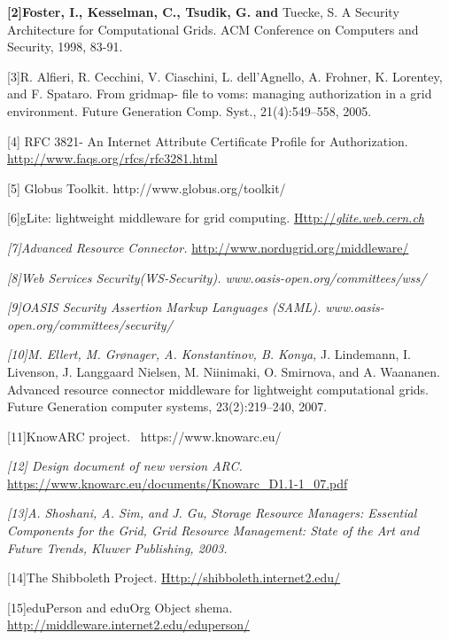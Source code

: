 \documentclass{article}
\newcommand\textstyleStrongEmphasis[1]{\textbf{#1}}
\newcommand\textstyleCitation[1]{\textit{#1}}
\begin{document}
\textstyleStrongEmphasis{\textmd{[2]}}\textstyleStrongEmphasis{\textmd{Foster,
I., Kesselman, C., Tsudik, G. and }}Tuecke, S. A Security Architecture
for Computational Grids. ACM Conference on Computers and Security,
1998, 83-91.

[3]R. Alfieri, R. Cecchini, V. Ciaschini, L.
dell{\textquoteright}Agnello, A. Frohner, K. Lorentey, and F. Spataro.
From gridmap- file to voms: managing authorization in a grid
environment. Future Generation Comp. Syst., 21(4):549--558, 2005. 

[4] RFC 3821- An Internet Attribute Certificate Profile for
Authorization. \url{http://www.faqs.org/rfcs/rfc3281.html}

[5] Globus Toolkit. http://www.globus.org/toolkit/

[6]gLite: lightweight middleware for grid computing.
\href{http://glite.web.cern.ch/}{Http://}\href{http://glite.web.cern.ch/}{\textstyleCitation{\textup{glite.web.cern.ch}}}

\textstyleCitation{\textup{[7]Advanced Resource Connector.
}}\url{http://www.nordugrid.org/middleware/}

\textstyleCitation{\textup{[8]Web Services Security(WS-Security).
www.oasis-open.org/committees/wss/}}

\textstyleCitation{\textup{[9]OASIS Security Assertion Markup Languages
(SAML). www.oasis-open.org/committees/security/}}

\textstyleCitation{\textup{[10]}}\textstyleCitation{\textup{M. Ellert,
M. Gr{\o}nager, A. Konstantinov, B. Konya, }}J. Lindemann, I. Livenson,
J. Langgaard Nielsen, M. Niinimaki, O. Smirnova, and A. Waananen.
Advanced resource connector middleware for lightweight computational
grids. Future Generation computer systems, 23(2):219--240, 2007.

[11]KnowARC project. \ https://www.knowarc.eu/

\textstyleCitation{\textup{[12] Design document of new version ARC.
}}\url{https://www.knowarc.eu/documents/Knowarc_D1.1-1_07.pdf}

\textstyleCitation{\textup{[13]A. Shoshani, A. Sim, and J. Gu,
}}\textstyleCitation{Storage Resource Managers: Essential Components
for the Grid}\textstyleCitation{\textup{, Grid Resource Management:
State of the Art and Future Trends, Kluwer Publishing, 2003.}}

[14]The Shibboleth Project.
\href{http://shibboleth.internet2.edu/}{Http://shibboleth.internet2.edu/}

[15]eduPerson and eduOrg Object shema.
\url{http://middleware.internet2.edu/eduperson/}
\end{document}
